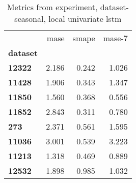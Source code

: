 \begin{table}[h]
\centering
\caption{Metrics from experiment, dataset-seasonal, local univariate lstm}
\label{table:local-univariate-lstm-dataset-seasonal}
\begin{tabular}{lrrr}
\toprule
{} &   mase &  smape &  mase-7 \\
\textbf{dataset} &        &        &         \\
\midrule
\textbf{12322  } &  2.186 &  0.242 &   1.026 \\
\textbf{11428  } &  1.906 &  0.343 &   1.347 \\
\textbf{11850  } &  1.560 &  0.368 &   0.556 \\
\textbf{11852  } &  2.843 &  0.311 &   0.780 \\
\textbf{273    } &  2.371 &  0.561 &   1.595 \\
\textbf{11036  } &  3.001 &  0.539 &   3.223 \\
\textbf{11213  } &  1.318 &  0.469 &   0.889 \\
\textbf{12532  } &  1.898 &  0.985 &   1.032 \\
\bottomrule
\end{tabular}
\end{table}
